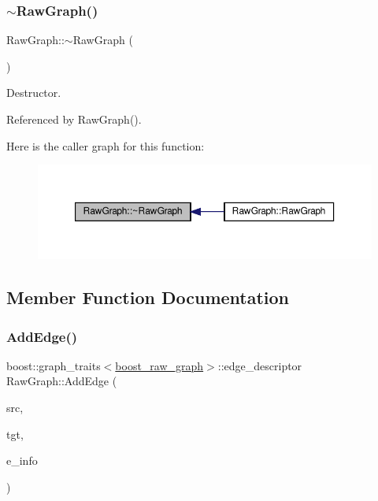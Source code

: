 \subsubsection{\texorpdfstring{$\sim$\+Raw\+Graph()}{~RawGraph()}}
{\footnotesize\ttfamily Raw\+Graph\+::$\sim$\+Raw\+Graph (\begin{DoxyParamCaption}{ }\end{DoxyParamCaption})\hspace{0.3cm}{\ttfamily [default]}}



Destructor. 



Referenced by Raw\+Graph().

Here is the caller graph for this function\+:
\nopagebreak
\begin{figure}[H]
\begin{center}
\leavevmode
\includegraphics[width=350pt]{dc/dd2/structRawGraph_af9945c60018468ccc8071aee7dde6933_icgraph}
\end{center}
\end{figure}


\subsection{Member Function Documentation}
\mbox{\label{structRawGraph_a5da66a6913553ac02de8405f98c0089a}} 
\subsubsection{\texorpdfstring{Add\+Edge()}{AddEdge()}}
{\footnotesize\ttfamily boost\+::graph\+\_\+traits$<$\hyperlink{graph_8hpp_afdae34b3d2ab29778d96da05f66add5c}{boost\+\_\+raw\+\_\+graph}$>$\+::edge\+\_\+descriptor Raw\+Graph\+::\+Add\+Edge (\begin{DoxyParamCaption}\item[{boost\+::graph\+\_\+traits$<$ \hyperlink{graph_8hpp_afdae34b3d2ab29778d96da05f66add5c}{boost\+\_\+raw\+\_\+graph} $>$\+::vertex\+\_\+descriptor}]{src,  }\item[{boost\+::graph\+\_\+traits$<$ \hyperlink{graph_8hpp_afdae34b3d2ab29778d96da05f66add5c}{boost\+\_\+raw\+\_\+graph} $>$\+::vertex\+\_\+descriptor}]{tgt,  }\item[{const \hyperlink{edge__info_8hpp_a65ddc964b1738667fc720f0de33aeef9}{Edge\+Info\+Ref}}]{e\+\_\+info }\end{DoxyParamCaption})\hspace{0.3cm}{\ttfamily [inline]}}



